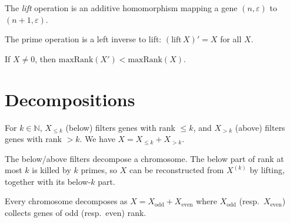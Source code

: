 \begin{definition}
  \label{def:Chromosome.lift}
  \leanok
  The \emph{lift} operation is an additive homomorphism mapping a gene
  $(n,\varepsilon)$ to $(n+1,\varepsilon)$.
\end{definition}

\begin{lemma}
  \label{lem:prime_lift_leftInverse}
  \leanok
  The prime operation is a left inverse to lift: $(\mathrm{lift}\, X)' = X$ for all $X$.
\end{lemma}

\begin{lemma}
  \label{lem:maxRank_prime_lt}
  \leanok
  If $X \ne 0$, then $\mathrm{maxRank}(X') < \mathrm{maxRank}(X)$.
\end{lemma}

\section{Decompositions}

\begin{definition}
  \label{def:below_above}
  \leanok
  For $k \in \mathbb{N}$, $X_{\le k}$ (below) filters genes with rank $\le k$,
  and $X_{> k}$ (above) filters genes with rank $> k$.
  We have $X = X_{\le k} + X_{> k}$.
\end{definition}

\begin{lemma}
  \label{lem:Chromosome.rank_decomposition}
  \leanok
  The below/above filters decompose a chromosome.  The below part of rank
  at most $k$ is killed by $k$ primes, so $X$ can be reconstructed from
  $X^{(k)}$ by lifting, together with its below-$k$ part.
\end{lemma}

\begin{definition}
  \label{def:parity}
  \leanok
  Every chromosome decomposes as $X = X_{\mathrm{odd}} + X_{\mathrm{even}}$
  where $X_{\mathrm{odd}}$ (resp.\ $X_{\mathrm{even}}$) collects genes of odd (resp.\ even) rank.
\end{definition}

